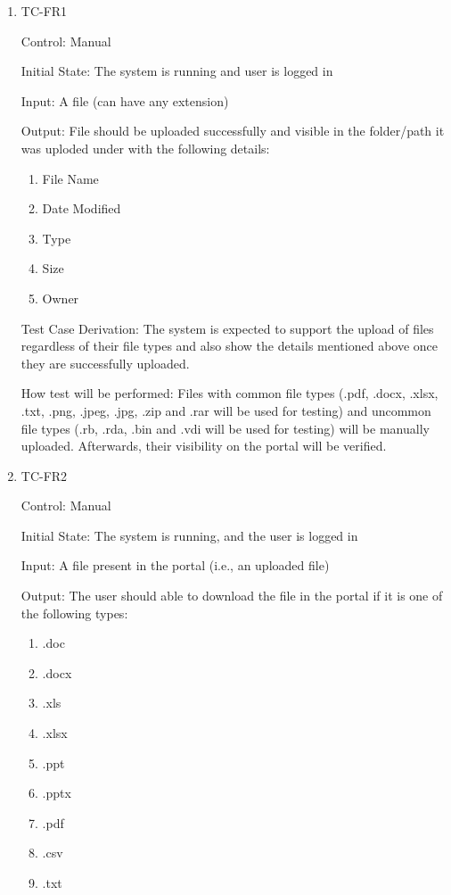 \documentclass[12pt, titlepage]{article}
\begin{document}
\begin{enumerate}

  \item{TC-FR1\\}

    Control: Manual

    Initial State: The system is running and user is logged in

    Input: A file (can have any extension)

    Output: File should be uploaded successfully and visible in the folder/path
    it was uploded under with the following details:
    \begin{enumerate}
      \item File Name
      \item Date Modified
      \item Type
      \item Size
      \item Owner
    \end{enumerate}

    Test Case Derivation: The system is expected to support the upload of files
    regardless of their file types and also show the details mentioned above
    once they are successfully uploaded.

    How test will be performed: Files with common file types
    (.pdf, .docx, .xlsx, .txt, .png, .jpeg, .jpg, .zip and .rar
    will be used for testing) and uncommon file types (.rb, .rda, .bin and .vdi
    will be used for testing) will be manually uploaded. Afterwards, their
    visibility on the portal will be verified.

  \item{TC-FR2\\}

    Control: Manual

    Initial State: The system is running, and the user is logged in

    Input: A file present in the portal (i.e., an uploaded file)

    Output: The user should able to download the file in the portal if it is one
    of the following types:
    \begin{enumerate}
      \item .doc
      \item .docx
      \item .xls
      \item .xlsx
      \item .ppt
      \item .pptx
      \item .pdf
      \item .csv
      \item .txt
    \end{enumerate}


\end{enumerate}
\end{document}
